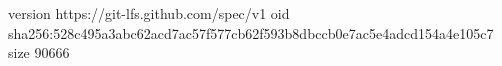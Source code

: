 version https://git-lfs.github.com/spec/v1
oid sha256:528c495a3abc62acd7ac57f577cb62f593b8dbccb0e7ac5e4adcd154a4e105c7
size 90666
